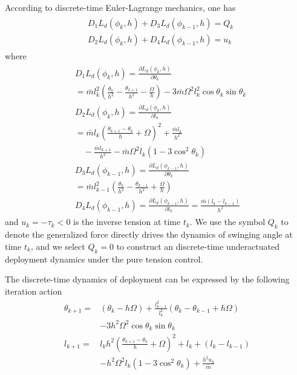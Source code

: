 \documentclass[10pt,onecolumn,draftcls]{IEEEtran}
\newcommand{\NPR}{\setcounter{equation}{\value{mytempeqncnt}}
\hrulefill
\vspace*{4pt}
\end{figure}}
\begin{document}
	According to discrete-time Euler-Lagrange mechanics, one has
	\begin{align}\begin{split}
	&D_1L_d(\phi_k,h)+D_3L_d(\phi_{k-1},h)=Q_k\\
	&D_2L_d(\phi_k,h)+D_4L_d(\phi_{k-1},h)=u_k
	\end{split}\end{align}
	where
	\begin{align}\begin{split}
		&D_1L_d(\phi_k,h)=\frac{\partial L_d(\phi_k,h)}{\partial \theta_k}\\
		&=\bar{m}l_k^2\left(\frac{\theta_{k}}{h^2}-\frac{\theta_{k+1}}{h^2}-\frac{\Omega}{h}\right)-3\bar{m}\Omega^2l^2_k\cos\theta_{k}\sin\theta_{k}\\
		&D_2L_d(\phi_k,h)=\frac{\partial L_d(\phi_k,h)}{\partial l_k}\\
		&=\bar{m}l_k\left(\frac{\theta_{k+1}-\theta_{k}}{h}+\Omega\right)^2+\frac{\bar{m}l_k}{h^2}\\
		&\quad-\frac{\bar{m}l_{k+1}}{h^2}-\bar{m}\Omega^2l_k(1-3\cos^2\theta_{k})\\
		&D_3L_d(\phi_{k-1},h)=\frac{\partial L_d(\phi_{k-1},h)}{\partial \theta_k}\\
		&=\bar{m}l^2_{k-1}\left(\frac{\theta_{k}}{h^2}-\frac{\theta_{k-1}}{h^2}+\frac{\Omega}{h}\right)\\
		&D_4L_d(\phi_{k-1},h)=\frac{\partial L_d(\phi_{k-1},h)}{\partial l_k}
		=\frac{\bar{m}(l_k-l_{k-1})}{h^2}
	\end{split}\end{align}
	and $u_k=-\tau_k< 0$ is the inverse tension at time $t_k$. We use the symbol $Q_k$ to denote the generalized force directly drives the dynamics of swinging angle at time $t_k$, and we select $Q_k=0$ to construct an discrete-time underactuated deployment dynamics under the pure tension control. 
	
	The discrete-time dynamics of deployment can be expressed by the following iteration action
	\begin{align}\begin{split}\label{eq:theta_k+1}
		\theta_{k+1}=&\left(\theta_{k}-h\Omega\right)+\frac{l^2_{k-1}}{l^2_k}\left(\theta_{k}-\theta_{k-1}+h\Omega\right)\\
		&-3h^2\Omega^2\cos\theta_{k}\sin\theta_{k}\\
		l_{k+1}=&l_kh^2\left(\frac{\theta_{k+1}-\theta_{k}}{h}+\Omega\right)^2+l_k+(l_k-l_{k-1})\\
		&-h^2\Omega^2l_k(1-3\cos^2\theta_{k})+\frac{h^2u_k}{\bar{m}}
	\end{split}\end{align}
	
\end{document}
